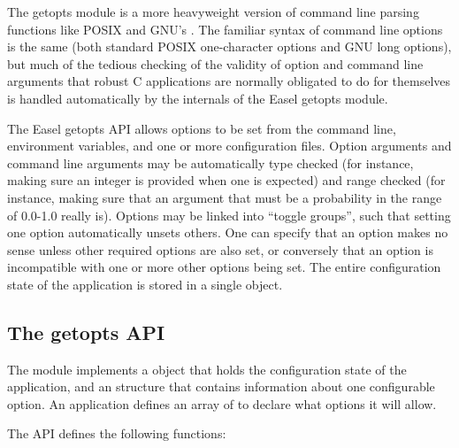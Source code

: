
The getopts module is a more heavyweight version of command line
parsing functions like POSIX  and GNU's
. The familiar syntax of command line options is
the same (both standard POSIX one-character options and GNU long
options), but much of the tedious checking of the validity of option
and command line arguments that robust C applications are normally
obligated to do for themselves is handled automatically by the
internals of the Easel getopts module.

The Easel getopts API allows options to be set from the command line,
environment variables, and one or more configuration files.  Option
arguments and command line arguments may be automatically type checked
(for instance, making sure an integer is provided when one is
expected) and range checked (for instance, making sure that an
argument that must be a probability in the range of 0.0-1.0 really
is). Options may be linked into ``toggle groups'', such that setting
one option automatically unsets others. One can specify that an option
makes no sense unless other required options are also set, or
conversely that an option is incompatible with one or more other
options being set. The entire configuration state of the application
is stored in a single object.

\subsection{The getopts API}

The module implements a  object that holds the
configuration state of the application, and an 
structure that contains information about one configurable option.  An
application defines an array of  to declare what
options it will allow.

The API defines the following functions:

